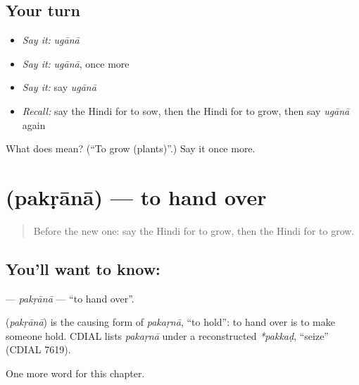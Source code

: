 \subsection*{Your turn}
\begin{itemize}
\raggedright
  \item \emph{Say it:} \emph{ugānā}
  \item \emph{Say it:} \emph{ugānā}, once more
  \item \emph{Say it:} say \emph{ugānā}
  \item \emph{Recall:} say the Hindi for to sow, then the Hindi for to grow, then say \emph{ugānā} again
\end{itemize}

\begin{tcolorbox}[breakable,colback=teal!4,colframe=teal!35!black,title={Before you move on}]
What does  mean? (\textquotedblleft{}To grow (plants)\textquotedblright{}.) Say it once more.
\end{tcolorbox}
\section[\texorpdfstring{\hi{पकड़ाना} (pakṛānā)}{पकड़ाना (pakṛānā)}]{ (pakṛānā) — to hand over}

\label{lesson:HI-C228-pakrana}



\begin{quote}
Before the new one: say the Hindi for to grow, then the Hindi for to grow.
\end{quote}

\subsection*{You'll want to know: }
\textbf{} — \emph{pakṛānā} — \textquotedblleft{}to hand over\textquotedblright{}.

\begin{cousinweb}
\textbf{} (\emph{pakṛānā}) is the causing form of \emph{pakaṛnā}, \textquotedblleft{}to hold\textquotedblright{}: to hand over is to make someone hold. CDIAL lists \emph{pakaṛnā} under a reconstructed \emph{*pakkaḍ}, \textquotedblleft{}seize\textquotedblright{} (CDIAL 7619).
\end{cousinweb}

\begin{grammarlens}[title={What you've built}]
One more word for this chapter.
\end{grammarlens}

